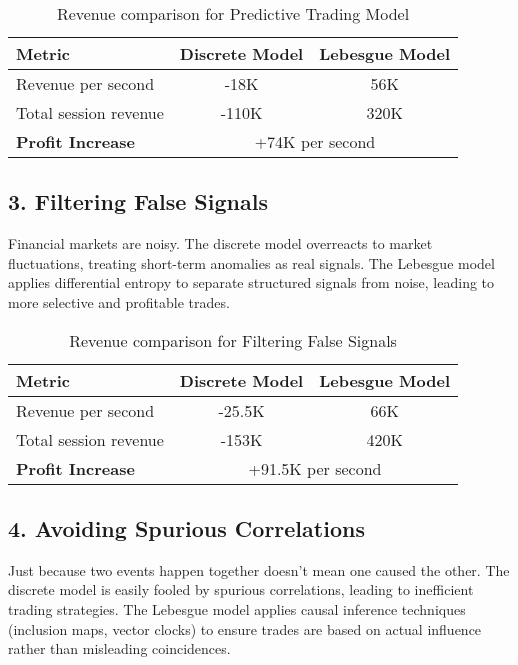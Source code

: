 \begin{table}[h]
    \centering
    \small
    \renewcommand{\arraystretch}{1.2}
    \begin{tabular}{lcc}
        \toprule
        \textbf{Metric} & \textbf{Discrete Model} & \textbf{Lebesgue Model} \\
        \midrule
        Revenue per second & -18K & 56K \\
        Total session revenue & -110K & 320K \\
        \textbf{Profit Increase} & \multicolumn{2}{c}{+74K per second} \\
        \bottomrule
    \end{tabular}
    \caption{Revenue comparison for Predictive Trading Model}
\end{table}

\subsection{3. Filtering False Signals}

\noindent Financial markets are noisy. The discrete model overreacts to market fluctuations, treating short-term anomalies as real signals. The Lebesgue model applies differential entropy to separate structured signals from noise, leading to more selective and profitable trades.

\begin{table}[h]
    \centering
    \small
    \renewcommand{\arraystretch}{1.2}
    \begin{tabular}{lcc}
        \toprule
        \textbf{Metric} & \textbf{Discrete Model} & \textbf{Lebesgue Model} \\
        \midrule
        Revenue per second & -25.5K & 66K \\
        Total session revenue & -153K & 420K \\
        \textbf{Profit Increase} & \multicolumn{2}{c}{+91.5K per second} \\
        \bottomrule
    \end{tabular}
    \caption{Revenue comparison for Filtering False Signals}
\end{table}

\subsection{4. Avoiding Spurious Correlations}

\noindent Just because two events happen together doesn’t mean one caused the other. The discrete model is easily fooled by spurious correlations, leading to inefficient trading strategies. The Lebesgue model applies causal inference techniques (inclusion maps, vector clocks) to ensure trades are based on actual influence rather than misleading coincidences.

